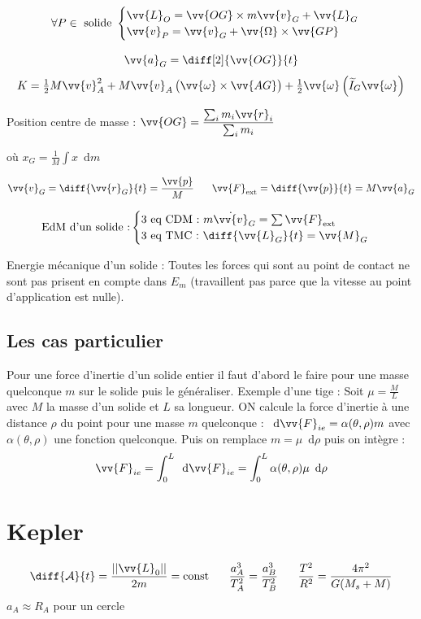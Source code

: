 \documentclass[landscape,a4paper]{article}
\newcommand{\dee}[1]{
  \,\,\,\mathrm{d}{#1}
}
\newcommand{\F}{\ensuremath{\vv{F}}}
\newcommand{\qm}{\ensuremath{\vv{p}}}
\newcommand{\pos}{\ensuremath{\vv{r}}}
\newcommand{\vi}{\ensuremath{\vv{v}}}
\newcommand{\vian}{\ensuremath{\vv{\omega}}}
\newcommand{\Vian}{\ensuremath{\vv{\Omega}}}
\newcommand{\ac}{\ensuremath{\vv{a}}}
\newcommand{\mc}{\ensuremath{\vv{L}}}
\newcommand{\mf}{\ensuremath{\vv{M}}}
\newcommand{\exte}{\text{ext}}
\newcommand{\ti}{\ensuremath{\widetilde{I}}}
\begin{document}
\begin{multicols}{4}
  \[ \forall P\in \text{ solide } 
    \begin{cases}
      \mc_O = \vv{OG}\times m\vi_G + \mc_G \\
      \vi_P = \vi_G + \Vian\times\vv{GP}
    \end{cases}
  \]

  \[
    \ac_G = \diff[2]{\vv{OG}}{t}
  \]
  \[
    K = \tfrac{1}{2}M\vi_A^2 + M\vi_A\left(\vian\times\vv{AG}\right) + \tfrac{1}{2}\vian\left(\ti_G\vian\right)
  \]

  Position centre de masse : \(\displaystyle \vv{OG}=\frac{\sum_im_i\pos_i}{\sum_im_i}\)

  où \(\displaystyle x_G = \frac{1}{M}\int x\dee m\) 


  \(\displaystyle \vi_G = \diff{\pos_G}{t}=\frac{\qm}{M}\phantom{text}\F_{\exte}=\diff{\qm}{t}=M\ac_G\)

  \[\text{EdM d'un solide :}
    \begin{cases}
      \text{3 eq CDM : }m\dot{\vi}_G=\sum\F_{\exte}\\
      \text{3 eq TMC : }\diff{\mc_G}{t}=\mf_G
    \end{cases}
  \]

  Energie mécanique d'un solide : Toutes les forces qui sont au point de contact ne sont pas prisent en compte dans \(E_m\) (travaillent pas parce que la vitesse au point d'application est nulle).

  \subsection{Les cas particulier}
  Pour une force d'inertie d'un solide entier il faut d'abord le faire pour une masse quelconque \(m\) sur le solide puis le généraliser. Exemple d'une tige : Soit \(\displaystyle\mu=\frac{M}{L}\) avec \(M\) la masse d'un solide et \(L\) sa longueur. ON calcule la force d'inertie à une distance \(\rho\) du point pour une masse \(m\) quelconque : \(\dee \F_{ie}=\alpha(\theta,\rho)m\) avec \(\alpha(\theta, \rho)\) une fonction quelconque. Puis on remplace \(m=\mu\dee \rho\) puis on intègre : 
  \[
    \F_{ie} = \int_0^L \dee\F_{ie} = \int_0^L\alpha(\theta,\rho)\mu\dee\rho
  \]

  \section{Kepler}
  \[
    \diff{\mathcal{A}}{t}=\frac{||\vv{L}_0||}{2m}=\text{const} \phantom{text} \frac{a_A^3}{T_A^2}=\frac{a_B^3}{T_B^2}\phantom{text} \frac{T^2}{R^2}=\frac{4 \pi^2}{G(M_s + M)}
  \]
  \(a_A\approx R_A\) pour un cercle

\end{multicols}
\end{document}
